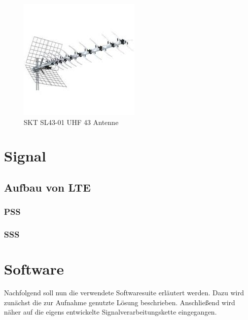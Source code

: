 \begin{figure}
    \centering
    \includegraphics[width=\textwidth]{images/antenne.png}
    \caption{SKT SL43-01 UHF 43 Antenne}\label{antenne}
\end{figure}
\section{Signal}
\subsection{Aufbau von LTE}
\subsubsection{PSS}
\subsubsection{SSS}
\section{Software}\label{sct:software}

Nachfolgend soll nun die verwendete Softwaresuite erläutert werden. Dazu wird zunächst die zur Aufnahme genutzte Lösung beschrieben. Anschließend wird näher auf die eigens entwickelte Signalverarbeitungskette eingegangen.

